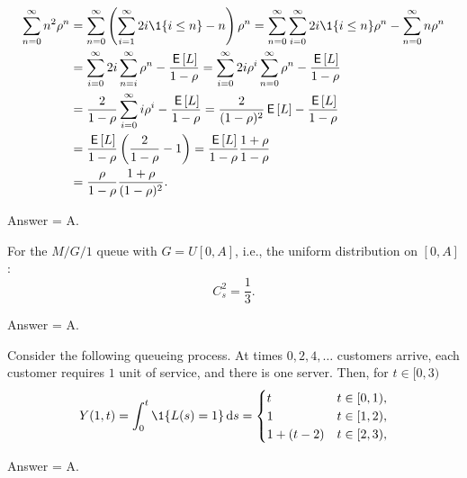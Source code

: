 \begin{exercise}[201703]
\begin{equation*}
 \begin{split}
 \sum_{n=0}^\infty n^2 \rho^n 
&= \sum_{n=0}^\infty \left(\sum_{i=1}^\infty 2i \1{i\leq n} - n\right)\rho^n 
= \sum_{n=0}^\infty \sum_{i=0}^\infty 2i\1{i\leq n}\rho^n - \sum_{n=0}^\infty n\rho^n \\
&= \sum_{i=0}^\infty 2i \sum_{n=i}^\infty \rho^n - \frac{\E L}{1-\rho} 
= \sum_{i=0}^\infty 2i \rho^i \sum_{n=0}^\infty \rho^n - \frac{\E L}{1-\rho} \\
&= \frac2{1-\rho} \sum_{i=0}^\infty i \rho^i - \frac{\E L}{1-\rho} 
= \frac2{(1-\rho)^2} \E L - \frac{\E L}{1-\rho} \\
&= \frac{\E L}{1-\rho} \left(\frac2{1-\rho} - 1\right) 
= \frac{\E L}{1-\rho} \frac{1+\rho}{1-\rho} \\
&= \frac{\rho}{1-\rho} \frac{1+\rho}{(1-\rho)^2}.
\end{split}
\end{equation*}

\begin{solution}
 Answer = A.
\end{solution}
\end{exercise}

\begin{exercise}[201703]
 For the $M/G/1$ queue with $G=U[0,A]$, i.e., the uniform
 distribution on $[0,A]$: 
 \begin{equation*}
C_s^2 = \frac 13.
 \end{equation*}

\begin{solution}
 Answer = A.
\end{solution}
\end{exercise}

\begin{exercise}[201704]%
 Consider the following queueing process. At times
 $0, 2,4, \ldots$ customers arrive, each customer requires $1$ unit
 of service, and there is one server. Then, for $t\in[0,3)$
 \begin{equation*}
 Y(1,t) = \int_0^t \1{L(s) = 1}\d s = 
 \begin{cases}
 t & t\in[0,1), \\
 1 & t\in[1,2), \\
 1+(t-2) & t\in[2,3), \\
 \end{cases}
 \end{equation*}
\begin{solution} Answer = A.
\end{solution}
\end{exercise}

